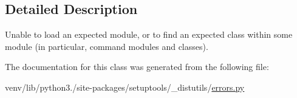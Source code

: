 \subsection{Detailed Description}
\begin{DoxyVerb}Unable to load an expected module, or to find an expected class
within some module (in particular, command modules and classes).\end{DoxyVerb}
 

The documentation for this class was generated from the following file\+:\begin{DoxyCompactItemize}
\item 
venv/lib/python3./site-\/packages/setuptools/\+\_\+distutils/\hyperlink{__distutils_2errors_8py}{errors.\+py}\end{DoxyCompactItemize}
